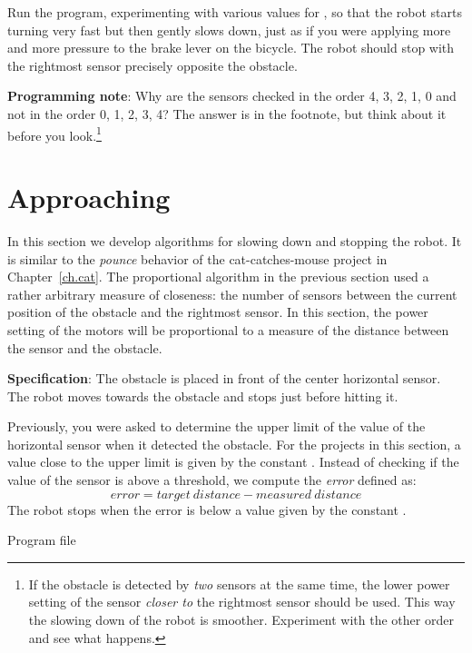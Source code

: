 Run the program, experimenting with various values for ,
so that the robot starts turning very fast but then gently
slows down, just as if you were applying more and more pressure to the
brake lever on the bicycle. The robot should stop with the rightmost
sensor precisely opposite the obstacle.

\textbf{Programming note}: Why are the sensors checked in the order 4,
3, 2, 1, 0 and not in the order 0, 1, 2, 3, 4? The answer is in the
footnote, but think about it before you look.\footnote{If the obstacle
is detected by \emph{two} sensors at the same time, the lower power
setting of the sensor \emph{closer to} the rightmost sensor should be
used. This way the slowing down of the robot is smoother. Experiment
with the other order and see what happens.}


\section{Approaching}

In this section we develop algorithms for slowing down and stopping the
robot. It is similar to the \emph{pounce} behavior of the
cat-catches-mouse project in Chapter~\ref{ch.cat}. The proportional
algorithm in the previous section used a rather arbitrary measure of
closeness: the number of sensors between the current position of the
obstacle and the rightmost sensor. In this section, the power setting of
the motors will be proportional to a measure of the distance between the
sensor and the obstacle.

\textbf{Specification}: The obstacle is placed in front of the center
horizontal sensor. The robot moves towards the obstacle and
stops just before hitting it.

Previously, you were asked to determine the upper limit of the value of
the horizontal sensor when it detected the obstacle. For the
projects in this section, a value close to the upper limit is
given by the constant . Instead of checking if the value of
the sensor is above a threshold, we compute the \emph{error} defined as:
\begin{displaymath}
\mathit{error} = \mathit{target\ distance} - \mathit{measured\ distance} 
\end{displaymath}
The robot stops when the error is below a value given by the constant
.

\label{s.on-off}

{\raggedleft \hfill Program file }


